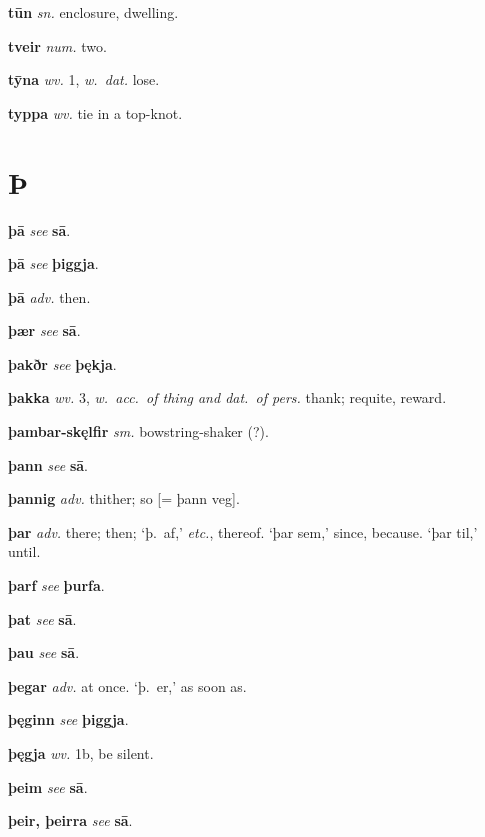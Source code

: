 \documentclass[12pt,letterpaper]{book}
\newcommand\emptypage{\clearpage{\pagestyle{empty}\cleardoublepage}}
\begin{document}
\noindent
\textbf{tūn} \textit{sn.} enclosure, dwelling.

\noindent
\textbf{tveir} \textit{num.} two.

\noindent
\textbf{tȳna} \textit{wv.} 1, \textit{w.\ dat.} lose.

\noindent
\textbf{typpa} \textit{wv.} tie in a top-knot.

\emptypage

\chapter*{Þ}

\noindent
\textbf{þā} \textit{} \textit{see} \textbf{sā}.

\noindent
\textbf{þā} \textit{} \textit{see} \textbf{þiggja}.

\noindent
\textbf{þā} \textit{adv.} then.

\noindent
\textbf{þær} \textit{} \textit{see} \textbf{sā}.

\noindent
\textbf{þakðr} \textit{} \textit{see} \textbf{þękja}.

\noindent
\textbf{þakka} \textit{wv.} 3, \textit{w.\ acc.\ of thing and dat.\ of
	pers.} thank; requite, reward.

\noindent
\textbf{þambar-skęlfir} \textit{sm.} bowstring-shaker (?).

\noindent
\textbf{þann} \textit{} \textit{see} \textbf{sā}.

\noindent
\textbf{þannig} \textit{adv.} thither; so [= þann veg].

\noindent
\textbf{þar} \textit{adv.} there; then; `þ.\ af,' \textit{etc.},
	thereof.  `þar sem,' since, because.  `þar til,' until.

\noindent
\textbf{þarf} \textit{} \textit{see} \textbf{þurfa}.

\noindent
\textbf{þat} \textit{} \textit{see} \textbf{sā}.

\noindent
\textbf{þau} \textit{} \textit{see} \textbf{sā}.

\noindent
\textbf{þegar} \textit{adv.} at once.  `þ.\ er,' as soon as.

\noindent
\textbf{þęginn} \textit{} \textit{see} \textbf{þiggja}.

\noindent
\textbf{þęgja} \textit{wv.} 1b, be silent.

\noindent
\textbf{þeim} \textit{} \textit{see} \textbf{sā}.

\noindent
\textbf{þeir, þeirra} \textit{} \textit{see} \textbf{sā}.
\end{document}

